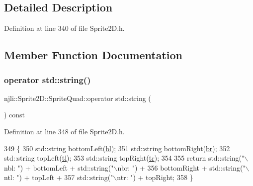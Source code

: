 \subsection{Detailed Description}


Definition at line 340 of file Sprite2\+D.\+h.



\subsection{Member Function Documentation}
\mbox{\label{classnjli_1_1_sprite2_d_1_1_sprite_quad_a34d7a2ea6b0b129abe89f2f6fd37a5a4}} 
\subsubsection{\texorpdfstring{operator std\+::string()}{operator std::string()}}
{\footnotesize\ttfamily njli\+::\+Sprite2\+D\+::\+Sprite\+Quad\+::operator std\+::string (\begin{DoxyParamCaption}{ }\end{DoxyParamCaption}) const\hspace{0.3cm}{\ttfamily [inline]}}



Definition at line 348 of file Sprite2\+D.\+h.


\begin{DoxyCode}
349       \{
350         std::string bottomLeft(\mbox{\hyperlink{classnjli_1_1_sprite2_d_1_1_sprite_quad_ae0ffef0622181dcc734b02cef8f45075}{bl}});
351         std::string bottomRight(\mbox{\hyperlink{classnjli_1_1_sprite2_d_1_1_sprite_quad_aa7033cec9b83bad9dfcadb89f29dcf94}{br}});
352         std::string topLeft(\mbox{\hyperlink{classnjli_1_1_sprite2_d_1_1_sprite_quad_aecfbaa6fa13750f9fa1347cf36d12f7e}{tl}});
353         std::string topRight(\mbox{\hyperlink{classnjli_1_1_sprite2_d_1_1_sprite_quad_a0eb387285104214c4b47b616a923d48d}{tr}});
354 
355         \textcolor{keywordflow}{return} std::string(\textcolor{stringliteral}{"\(\backslash\)nbl: "}) + bottomLeft + std::string(\textcolor{stringliteral}{"\(\backslash\)nbr: "}) +
356                bottomRight + std::string(\textcolor{stringliteral}{"\(\backslash\)ntl: "}) + topLeft +
357                std::string(\textcolor{stringliteral}{"\(\backslash\)ntr: "}) + topRight;
358       \}
\end{DoxyCode}
\mbox{\label{classnjli_1_1_sprite2_d_1_1_sprite_quad_a97bb5f82275fdce50e4352eab0e14e6c}} 
